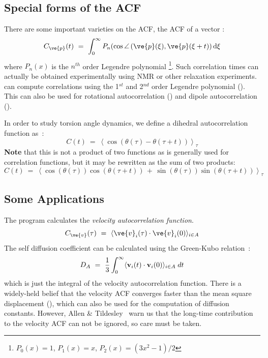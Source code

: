 \subsection{Special forms of the ACF}
There are some important varieties on the ACF, {\eg} the ACF of a vector :
\begin{equation}
C_{\ve{p}}(t) ~=~       \int_0^{\infty} P_n(\cos\angle\left(\ve{p}(\xi),\ve{p}(\xi+t)\right) {\rm d} \xi
\label{eqn:corrleg}
\end{equation}
where $P_n(x)$ is the $n^{th}$ order Legendre polynomial
\footnote{$P_0(x) = 1$, $P_1(x) = x$, $P_2(x) = (3x^2-1)/2$}.
Such correlation times 
can actually be obtained experimentally using {\eg} NMR or other relaxation 
experiments. {\gromacs} can compute correlations using 
the 1$^{st}$ and 2$^{nd}$ order Legendre polynomial ().
This can also be used for rotational autocorrelation
({\tt {}})
and dipole autocorrelation ({\tt {}}).

In order to study torsion angle dynamics, we define a dihedral 
autocorrelation function as~\cite{Spoel97a}:
\begin{equation}
C(t)    ~=~     \left\langle \cos(\theta(\tau)-\theta(\tau+t))\right\rangle_{\tau}
\label{eqn:coenk}
\end{equation}
{\bf Note} that this is not a  product of two functions 
as is generally used for correlation
functions, but it may be rewritten as the sum of two products:
\begin{equation}
C(t)    ~=~     \left\langle\cos(\theta(\tau))\cos(\theta(\tau+t))\,+\,\sin(\theta(\tau))\sin(\theta(\tau+t))\right\rangle_{\tau}
\label{eqn:cot}
\end{equation}

\subsection{Some Applications}
The program {\tt {}} calculates the {\em velocity autocorrelation 
function}.
\begin{equation}
C_{\ve{v}} (\tau) ~=~ \langle {\ve{v}}_i(\tau) \cdot {\ve{v}}_i(0) \rangle_{i \in A}
\end{equation}
The self diffusion coefficient can be calculated using the Green-Kubo 
relation~\cite{Allen87}:
\begin{equation}
D_A ~=~ {1\over 3} \int_0^{\infty} \langle {\bf v}_i(t) \cdot {\bf v}_i(0) \rangle_{i \in A} \; dt
\end{equation}
which is just the integral of the velocity autocorrelation function.
There is a widely-held belief that the velocity ACF converges faster than the mean
square displacement (), which can also be used for the computation of 
diffusion constants. However, Allen \& Tildesley~\cite{Allen87} 
warn us that the long-time 
contribution to the velocity ACF can not be ignored, so care must be taken.

